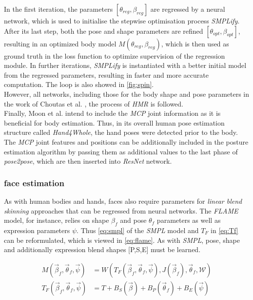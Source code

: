 In the first iteration, the parameters $[\theta_{reg},\beta_{reg}]$ are regressed by a neural network, which is used to initialise the stepwise optimisation process \emph{SMPLify}. After its last step, both the pose and shape parameters are refined $[\theta_{opt},\beta_{opt}]$, resulting in an optimized body model $M(\theta_{reg},\beta_{reg})$, which is then used as ground truth in the loss function to optimize supervision of the regression module. In further iterations, \emph{SMPLify} is instantiated with a better initial model from the regressed parameters, resulting in faster and more accurate computation. The loop is also showed in \autoref{fig:spin}.\\
However, all networks, including those for the body shape and pose parameters in the work of Choutas et al. \cite{expose}, the process of \emph{HMR} is followed. \\
Finally, Moon et al. \cite{moon} intend to include the \emph{MCP} joint information as it is beneficial for body estimation. Thus, in its overall human pose estimation structure called \emph{Hand4Whole}, the hand poses were detected prior to the body. The \emph{MCP} joint features and positions can be additionally included in the posture estimation algorithm by passing them as additional values to the last phase of \emph{pose2pose}, which are then inserted into \emph{ResNet} network. \\

\subsubsection{face estimation}
As with human bodies and hands, faces also require parameters for \emph{linear blend skinning} approaches that can be regressed from neural networks. The \emph{FLAME} model, for instance, relies on shape $\beta_{f}$ and pose $\theta_{f}$ parameters as well as expression parameters  $\psi$. Thus \autoref{eq:smpl} of the \emph{SMPL} model and $T_{F}$ in \autoref{eq:Tf} can be reformulated, which is viewed in \autoref{eq:flame}. As with \emph{SMPL}, pose, shape and additionally expression blend shapes [P,S,E] must be learned. \cite{flame}

\begin{equation}
\label{eq:flame}
\begin{split}
M(\vec{\beta}_{f},\vec{\theta}_{f}, \vec{\psi}) &= W(T_{F}(\vec{\beta}_{f},\vec{\theta}_{f}, \vec{\psi}),J(\vec{\beta}_{f}),\vec{\theta}_{f},\mathcal{W}) \\
T_{F}(\vec{\beta}_{f},\vec{\theta}_{f}, \vec{\psi}) &= T + B_{S}(\vec{\beta}) + B_{P}(\vec{\theta}_{f}) + B_{E} (\vec{\psi})
\end{split}
\end{equation}

